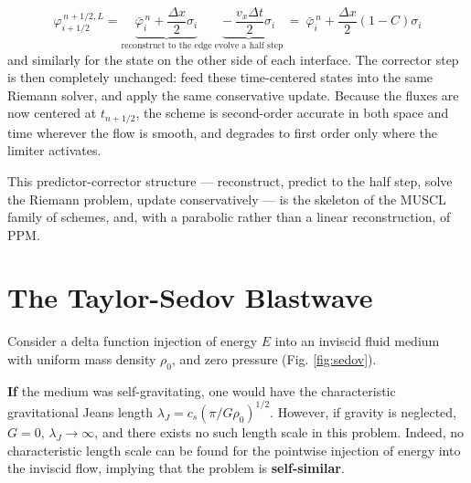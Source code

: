 \documentclass[notoc]{tufte-handout}
\begin{document}
\begin{equation}
\varphi^{\,n+1/2, L}_{i+1/2} = \underbrace{\bar{\varphi}_i^{\,n} + \frac{\Delta x}{2}\sigma_i}_{\text{reconstruct to the edge}} ~ \underbrace{- ~ \frac{v_x \Delta t}{2}\sigma_i}_{\text{evolve a half step}} ~ = ~ \bar{\varphi}_i^{\,n} + \frac{\Delta x}{2}\left( 1 - C \right)\sigma_i
\end{equation}
%
and similarly for the state on the other side of each interface. The corrector step is then completely unchanged: feed these time-centered states into the same Riemann solver, and apply the same conservative update. Because the fluxes are now centered at $t_{n+1/2}$, the scheme is second-order accurate in both space and time wherever the flow is smooth, and degrades to first order only where the limiter activates.

This predictor-corrector structure --- reconstruct, predict to the half step, solve the Riemann problem, update conservatively --- is the skeleton of the MUSCL family of schemes, and, with a parabolic rather than a linear reconstruction, of PPM.


\section{The Taylor-Sedov Blastwave}

Consider a delta function injection of energy $E$ into an inviscid fluid medium with uniform mass density $\rho_0$, and zero pressure (Fig. \ref{fig:sedov}).

\begin{marginfigure}
\caption{A point injection of energy $E$ into a uniform, pressureless medium. Because there is no characteristic length scale in the problem, the solution is self-similar.}
\label{fig:sedov}
\end{marginfigure}

{\bf If} the medium was self-gravitating, one would have the characteristic gravitational Jeans length $\lambda_J = c_s \left( \pi / G\rho_0 \right)^{1/2}$. However, if gravity is neglected, $G = 0$, $\lambda_J \rightarrow \infty$, and there exists no such length scale in this problem. Indeed, no characteristic length scale can be found for the pointwise injection of energy into the inviscid flow, implying that the problem is {\bf self-similar}. 
\end{document}
